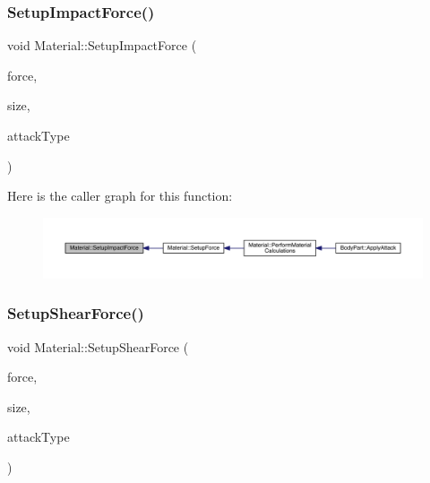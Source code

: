 \subsubsection{\texorpdfstring{Setup\+Impact\+Force()}{SetupImpactForce()}}
{\footnotesize\ttfamily void Material\+::\+Setup\+Impact\+Force (\begin{DoxyParamCaption}\item[{float}]{force,  }\item[{float}]{size,  }\item[{\mbox{\hyperlink{_enum_types_8hpp_a904b2f9c8f3951116c343784c59d6afe}{Attack\+Type}}}]{attack\+Type }\end{DoxyParamCaption})\hspace{0.3cm}{\ttfamily [private]}}

Here is the caller graph for this function\+:
\nopagebreak
\begin{figure}[H]
\begin{center}
\leavevmode
\includegraphics[width=350pt]{dc/dee/class_material_a0306582d701642b867f9c53c769ffaf7_icgraph}
\end{center}
\end{figure}
\mbox{\label{class_material_a65d6bf35a560e97da3468e91178facdc}} 
\subsubsection{\texorpdfstring{Setup\+Shear\+Force()}{SetupShearForce()}}
{\footnotesize\ttfamily void Material\+::\+Setup\+Shear\+Force (\begin{DoxyParamCaption}\item[{float}]{force,  }\item[{float}]{size,  }\item[{\mbox{\hyperlink{_enum_types_8hpp_a904b2f9c8f3951116c343784c59d6afe}{Attack\+Type}}}]{attack\+Type }\end{DoxyParamCaption})\hspace{0.3cm}{\ttfamily [private]}}

